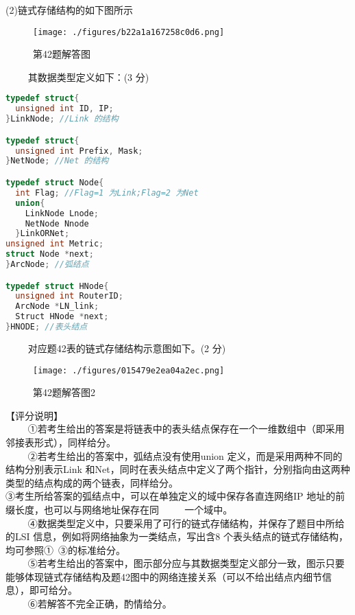 (2)链式存储结构的如下图所示
\begin{figure}[ht]
\centering
\texttt{[image: ./figures/b22a1a167258c0d6.png]}
\caption{第42题解答图} \label{fig_CSN14_7}
\end{figure}
$\qquad$ 其数据类型定义如下：(3 分) \\
\begin{lstlisting}[language=cpp]
typedef struct{
  unsigned int ID, IP;
}LinkNode; //Link 的结构

typedef struct{
  unsigned int Prefix, Mask;
}NetNode; //Net 的结构

typedef struct Node{
  int Flag; //Flag=1 为Link;Flag=2 为Net
  union{
    LinkNode Lnode;
    NetNode Nnode
  }LinkORNet;
unsigned int Metric;
struct Node *next;
}ArcNode; //弧结点

typedef struct HNode{
  unsigned int RouterID;
  ArcNode *LN_link;
  Struct HNode *next;
}HNODE; //表头结点
\end{lstlisting}
$\qquad$ 对应题42表的链式存储结构示意图如下。(2 分)
\begin{figure}[ht]
\centering
\texttt{[image: ./figures/015479e2ea04a2ec.png]}
\caption{第42题解答图2} \label{fig_CSN14_8}
\end{figure}
【评分说明】 \\
$\qquad$ ①若考生给出的答案是将链表中的表头结点保存在一个一维数组中（即采用邻接表形式），同样给分。  \\
$\qquad$ ②若考生给出的答案中，弧结点没有使用union 定义，而是采用两种不同的结构分别表示Link 和Net，同时在表头结点中定义了两个指针，分别指向由这两种类型的结点构成的两个链表，同样给分。 \\
③考生所给答案的弧结点中，可以在单独定义的域中保存各直连网络IP 地址的前缀长度，也可以与网络地址保存在同 $\qquad$ 一个域中。 \\
$\qquad$ ④数据类型定义中，只要采用了可行的链式存储结构，并保存了题目中所给的LSI 信息，例如将网络抽象为一类结点，写出含8 个表头结点的链式存储结构，均可参照①~③的标准给分。 \\
$\qquad$ ⑤若考生给出的答案中，图示部分应与其数据类型定义部分一致，图示只要能够体现链式存储结构及题42图中的网络连接关系（可以不给出结点内细节信息），即可给分。 \\
$\qquad$ ⑥若解答不完全正确，酌情给分。

